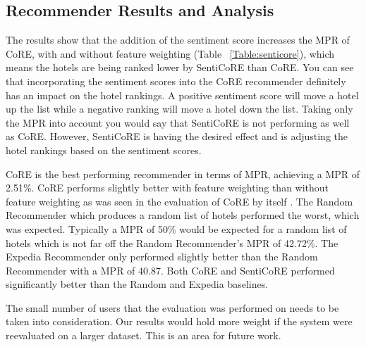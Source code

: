 \subsection{Recommender Results and Analysis}

The results show that the addition of the sentiment score increases the MPR of CoRE, with and without feature weighting (Table ~\ref{Table:senticore}), which means the hotels are being ranked lower by SentiCoRE than CoRE. You can see that incorporating the sentiment scores into the CoRE recommender definitely has an impact on the hotel rankings. A positive sentiment score will move a hotel up the list while a negative ranking will move a hotel down the list. Taking only the MPR into account you would say that SentiCoRE is not performing as well as CoRE. However, SentiCoRE is having the desired effect and is adjusting the hotel rankings based on the sentiment scores.

\begin{table}[h!]
\caption{Recommender Systems Performance.}
\label{Table:senticore}
\end{table}

CoRE is the best performing recommender in terms of MPR, achieving a MPR of 2.51\%. CoRE performs slightly better with feature weighting than without feature weighting as was seen in the evaluation of CoRE by itself \cite{core2019}. The Random Recommender which produces a random list of hotels performed the worst, which was expected. Typically a MPR of 50\% would be expected for a random list of hotels which is not far off the Random Recommender's MPR of 42.72\%. The Expedia Recommender only performed slightly better than the Random Recommender with a MPR of 40.87. Both CoRE and SentiCoRE performed significantly better than the Random and Expedia baselines.

The small number of users that the evaluation was performed on needs to be taken into consideration. Our results would hold more weight if the system were reevaluated on a larger dataset. This is an area for future work.